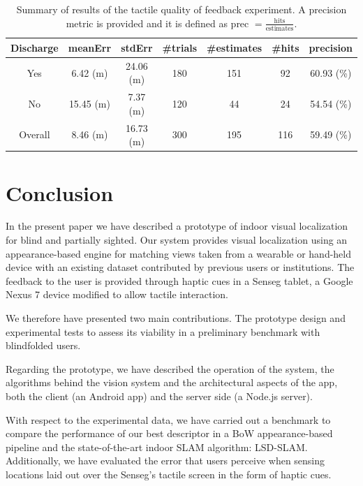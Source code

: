 \begin{table}
\centering
    \begin{tabular}{ccccccc}
     Discharge & meanErr & stdErr  & \#trials & \#estimates & \#hits & precision \\ \hline 
    Yes 			      &  6.42 (m)        & 24.06 (m)   & 180    & 151       & 92   & 60.93 (\%)     \\ \hline
    No  				  &  15.45 (m)      & 7.37 (m)  & 120    & 44        & 24   & 54.54 (\%)    \\ \hline
	Overall &  8.46 (m)   & 16.73 (m) & 300 & 195 & 116 & 59.49 (\%)  \\ \hline
    
    \end{tabular}
        \caption {Summary of results of the tactile quality of feedback experiment. A precision metric is provided and it is defined as prec $= \frac{\text{hits}}{\text{estimates}}$. }
\label{tab:sensegSummaries}
\end{table}



\section{Conclusion}
\label{sec:conclusion}

In the present paper we have described a prototype of indoor visual localization for blind and partially sighted. Our system provides visual localization using an appearance-based engine for matching views taken from a wearable or hand-held device with an existing dataset contributed by previous users or institutions. The feedback to the user is provided through haptic cues in a Senseg tablet, a Google Nexus 7 device modified to allow tactile interaction.

We therefore have presented two main contributions. The prototype design and experimental tests to assess its viability in a preliminary benchmark with blindfolded users.

Regarding the prototype, we have described the operation of the system, the algorithms behind the vision system and the architectural aspects of the app, both the client (an Android app) and the server side (a Node.js server).

With respect to the experimental data, we have carried out a benchmark to compare the performance of our best descriptor in a BoW appearance-based pipeline and the state-of-the-art indoor SLAM algorithm: LSD-SLAM. Additionally, we have evaluated the error that users perceive when sensing locations laid out over the Senseg's tactile screen in the form of haptic cues.

